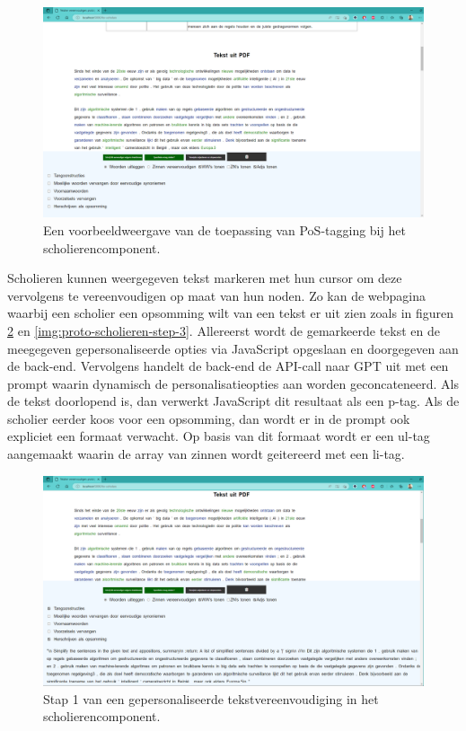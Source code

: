 \begin{center}
	\begin{figure}[H]
		\includegraphics[width=\linewidth]{img/proto-pos-tagging.png}
		\caption{Een voorbeeldweergave van de toepassing van PoS-tagging bij het scholierencomponent.}
		\label{img:proto-pos-tagging-scholieren}
	\end{figure}
\end{center}

Scholieren kunnen weergegeven tekst markeren met hun cursor om deze vervolgens te vereenvoudigen op maat van hun noden. Zo kan de webpagina waarbij een scholier een opsomming wilt van een tekst er uit zien zoals in figuren \ref{img:proto-scholieren-step-1} en \ref{img:proto-scholieren-step-3}. Allereerst wordt de gemarkeerde tekst en de meegegeven gepersonaliseerde opties via JavaScript opgeslaan en doorgegeven aan de back-end. Vervolgens handelt de back-end de API-call naar GPT uit met een prompt waarin dynamisch de personalisatieopties aan worden geconcateneerd. Als de tekst doorlopend is, dan verwerkt JavaScript dit resultaat als een p-tag. Als de scholier eerder koos voor een opsomming, dan wordt er in de prompt ook expliciet een formaat verwacht. Op basis van dit formaat wordt er een ul-tag aangemaakt waarin de array van zinnen wordt geitereerd met een li-tag.

\begin{center}
	\begin{figure}[H]
		\includegraphics[width=\linewidth]{img/proto-opsomming-1.png}
		\caption{Stap 1 van een gepersonaliseerde tekstvereenvoudiging in het scholierencomponent.}
		\label{img:proto-scholieren-step-1}
	\end{figure}
\end{center}

